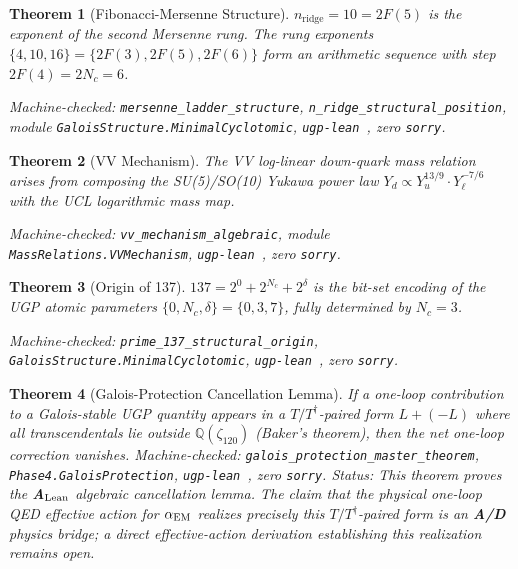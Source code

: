 \documentclass[11pt]{article}
\newtheorem{theorem}{Theorem}[section]
\theoremstyle{remark}
\newcommand{\Nc}{N_c}
\newcommand{\ddelta}{\delta}
\newcommand{\zetaN}[1]{\zeta_{#1}}
\begin{document}
\begin{theorem}[Fibonacci-Mersenne Structure]
$n_{\mathrm{ridge}} = 10 = 2F(5)$ is the exponent of the second Mersenne rung.
The rung exponents $\{4,10,16\} = \{2F(3),2F(5),2F(6)\}$ form an arithmetic
sequence with step $2F(4) = 2\Nc = 6$.

\medskip\noindent
\textit{Machine-checked: \texttt{mersenne\_ladder\_structure}, \texttt{n\_ridge\_structural\_position},
module \texttt{GaloisStructure.MinimalCyclotomic}, \texttt{ugp-lean}~\cite{ugp-lean}, zero \texttt{sorry}.}
\end{theorem}

\begin{theorem}[VV Mechanism]
The VV log-linear down-quark mass relation arises from composing the SU(5)/SO(10)
Yukawa power law $Y_d \propto Y_u^{13/9} \cdot Y_\ell^{-7/6}$ with the UCL
logarithmic mass map.

\medskip\noindent
\textit{Machine-checked: \texttt{vv\_mechanism\_algebraic},
module \texttt{MassRelations.VVMechanism}, \texttt{ugp-lean}~\cite{ugp-lean}, zero \texttt{sorry}.}
\end{theorem}

\begin{theorem}[Origin of 137]
$137 = 2^0 + 2^{\Nc} + 2^{\ddelta}$ is the bit-set encoding of the UGP atomic
parameters $\{0, \Nc, \ddelta\} = \{0,3,7\}$, fully determined by $\Nc = 3$.

\medskip\noindent
\textit{Machine-checked: \texttt{prime\_137\_structural\_origin},
\texttt{Galois\-Structure.\-Minimal\-Cyclo\-tomic},
\texttt{ugp-lean}~\cite{ugp-lean}, zero \texttt{sorry}.}
\end{theorem}

\begin{theorem}[Galois-Protection Cancellation Lemma]
If a one-loop contribution to a Galois-stable UGP quantity appears in a
$T/T^\dagger$-paired form $L+(-L)$ where all transcendentals lie outside
$\mathbb{Q}(\zetaN{120})$ (Baker's theorem), then the net one-loop correction vanishes.
\medskip\noindent
\textit{Machine-checked: \texttt{galois\_protection\_master\_theorem},
\texttt{Phase4.GaloisProtection}, \texttt{ugp-lean}~\cite{ugp-lean}, zero \texttt{sorry}.}
\medskip\noindent
\textit{Status:} This theorem proves the \textbf{A$_{\rm Lean}$} algebraic cancellation lemma.
The claim that the physical one-loop QED effective action for $\alpha_{\rm EM}$
realizes precisely this $T/T^\dagger$-paired form is an \textbf{A/D} physics bridge;
a direct effective-action derivation establishing this realization remains open.
\end{theorem}
\end{document}
